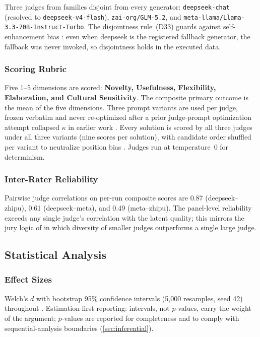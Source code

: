 \documentclass[12pt,a4paper]{article}
\begin{document}
Three judges from families disjoint from every generator: \texttt{deepseek-chat}
(resolved to \texttt{deepseek-v4-flash}), \texttt{zai-org/GLM-5.2}, and
\texttt{meta-llama/Llama-3.3-70B-Instruct-Turbo}. The disjointness rule~(D33)
guards against self-enhancement bias \citep{ZhengEtAl2023}: even when deepseek
is the registered fallback generator, the fallback was never invoked, so
disjointness holds in the executed data.

\subsubsection{Scoring Rubric}

Five 1--5 dimensions are scored: \textbf{Novelty, Usefulness, Flexibility,
Elaboration, and Cultural Sensitivity}. The composite
primary outcome is the mean of the five dimensions. Three prompt variants
are used per judge, frozen verbatim and never re-optimized after a prior
judge-prompt optimization attempt collapsed $\kappa$ in earlier work
\citep{Hariri2025a}. Every solution is scored by all three judges under all
three variants (nine scores per solution), with candidate order shuffled per
variant to neutralize position bias \citep{ZhengEtAl2023}. Judges run at
temperature~0 for determinism.

\subsubsection{Inter-Rater Reliability}

Pairwise judge correlations on per-run composite scores are 0.87
(deepseek--zhipu), 0.61 (deepseek--meta), and 0.49 (meta--zhipu). The
panel-level reliability exceeds any single judge's correlation with the latent
quality; this mirrors the jury logic of \citet{VergaEtAl2024} in which diversity
of smaller judges outperforms a single large judge.

\subsection{Statistical Analysis}

\subsubsection{Effect Sizes}

Welch's $d$ with bootstrap 95\% confidence intervals (5{,}000 resamples, seed
42) throughout \citep{Lakens2013}. Estimation-first reporting: intervals, not
$p$-values, carry the weight of the argument; $p$-values are reported for
completeness and to comply with sequential-analysis boundaries
(\cref{sec:inferential}).
\end{document}
